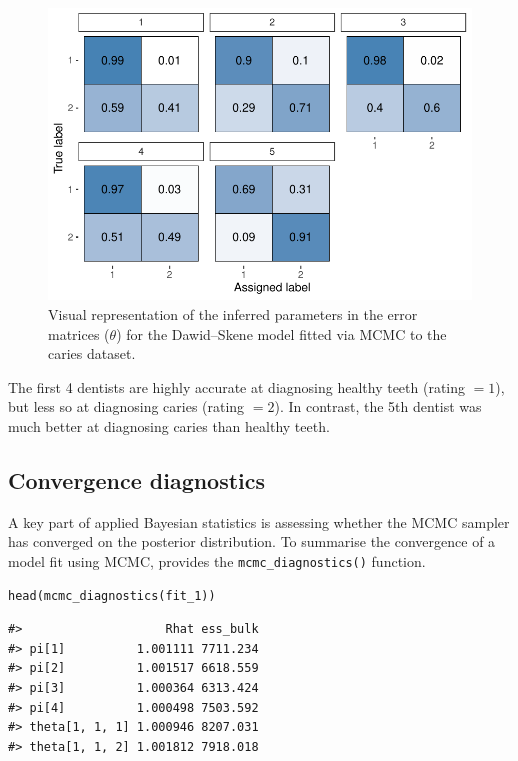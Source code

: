 \begin{figure}

{\centering \includegraphics{RJ-2023-064_files/figure-latex/plot-theta-caries-1} 

}

\caption{Visual representation of the inferred parameters in the error matrices ($\theta$) for the Dawid--Skene model fitted via MCMC to the caries dataset.}\label{fig:plot-theta-caries}
\end{figure}

The first 4 dentists are highly accurate at diagnosing healthy teeth (rating \(= 1\)), but less so at diagnosing caries (rating \(= 2\)). In contrast, the 5th
dentist was much better at diagnosing caries than healthy teeth.

\hypertarget{sec:convergence-diagnostics}{%
\subsection{Convergence diagnostics}\label{sec:convergence-diagnostics}}

A key part of applied Bayesian statistics is assessing whether the
MCMC sampler has converged on the posterior distribution. To summarise the
convergence of a model fit using MCMC,  provides the
\texttt{mcmc\_diagnostics()} function.

\begin{verbatim}
head(mcmc_diagnostics(fit_1))
\end{verbatim}

\begin{verbatim}
#>                    Rhat ess_bulk
#> pi[1]          1.001111 7711.234
#> pi[2]          1.001517 6618.559
#> pi[3]          1.000364 6313.424
#> pi[4]          1.000498 7503.592
#> theta[1, 1, 1] 1.000946 8207.031
#> theta[1, 1, 2] 1.001812 7918.018
\end{verbatim}

